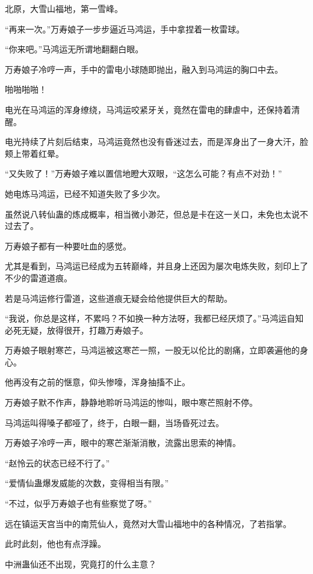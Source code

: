 
\begin{this_body}

北原，大雪山福地，第一雪峰。

“再来一次。”万寿娘子一步步逼近马鸿运，手中拿捏着一枚雷球。

“你来吧。”马鸿运无所谓地翻翻白眼。

万寿娘子冷哼一声，手中的雷电小球随即抛出，融入到马鸿运的胸口中去。

啪啪啪啪！

电光在马鸿运的浑身缭绕，马鸿运咬紧牙关，竟然在雷电的肆虐中，还保持着清醒。

电光持续了片刻后结束，马鸿运竟然也没有昏迷过去，而是浑身出了一身大汗，脸颊上带着红晕。

“又失败了！”万寿娘子难以置信地瞪大双眼，“这怎么可能？有点不对劲！”

她电炼马鸿运，已经不知道失败了多少次。

虽然说八转仙蛊的炼成概率，相当微小渺茫，但总是卡在这一关口，未免也太说不过去了。

万寿娘子都有一种要吐血的感觉。

尤其是看到，马鸿运已经成为五转巅峰，并且身上还因为屡次电炼失败，刻印上了不少的雷道道痕。

若是马鸿运修行雷道，这些道痕无疑会给他提供巨大的帮助。

“我说，你总是这样，不累吗？不如换一种方法呀，我都已经厌烦了。”马鸿运自知必死无疑，放得很开，打趣万寿娘子。

万寿娘子眼射寒芒，马鸿运被这寒芒一照，一股无以伦比的剧痛，立即袭遍他的身心。

他再没有之前的惬意，仰头惨嚎，浑身抽搐不止。

万寿娘子默不作声，静静地聆听马鸿运的惨叫，眼中寒芒照射不停。

马鸿运叫得嗓子都哑了，终于，白眼一翻，当场昏死过去。

万寿娘子冷哼一声，眼中的寒芒渐渐消散，流露出思索的神情。

“赵怜云的状态已经不行了。”

“爱情仙蛊爆发威能的次数，变得相当有限。”

“不过，似乎万寿娘子也有些察觉了呀。”

远在镇运天宫当中的南荒仙人，竟然对大雪山福地中的各种情况，了若指掌。

此时此刻，他也有点浮躁。

中洲蛊仙还不出现，究竟打的什么主意？


\end{this_body}
